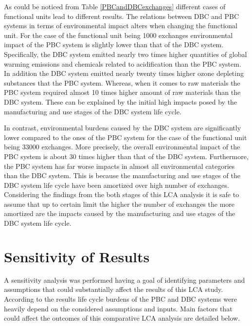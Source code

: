 \documentclass[conference]{IEEEtran}
\begin{document}
As could be noticed from Table \ref{PBCandDBCexchanges} different cases of functional units lead to different results. The relations between DBC and PBC systems in terms of environmental impact alters when changing the functional unit. For the case of the functional unit being 1000 exchanges environmental impact of the PBC system is slightly lower than that of the DBC system. Specifically, the DBC system emitted nearly two times higher quantities of global warming emissions and chemicals  related to acidification than the PBC system. In addition the DBC system emitted nearly twenty times higher ozone depleting substances that the PBC system. Whereas, when it comes to raw materials the PBC system required almost 10 times higher amount of raw materials than the DBC system. These can be explained by the initial high impacts posed by the manufacturing and use stages of the DBC system life cycle. 

In contrast, environmental burdens caused by the DBC system are significantly lower compared to the ones of the PBC system for the case of the functional unit being 33000 exchanges. More precisely, the overall environmental impact of the PBC system is about 30 times higher than that of the DBC system. Furthermore, the PBC system has far worse impacts in almost all environmental categories than the DBC system. This is because the manufacturing and use stages of the DBC system life cycle have been amortized over high number of exchanges. Considering the findings from the both stages of this LCA analysis it is safe to assume that up to certain limit the higher the number of exchanges the more amortized are the impacts caused by the manufacturing and use stages of the DBC system life cycle.

\section{Sensitivity of Results}

A sensitivity analysis was performed having a goal of identifying parameters and assumptions that could substantially affect the results of this LCA study. According to the results life cycle burdens of the PBC and DBC systems were heavily depend on the considered assumptions and inputs. Main factors that could affect the outcomes of this comparative LCA analysis are detailed below.
\end{document}
